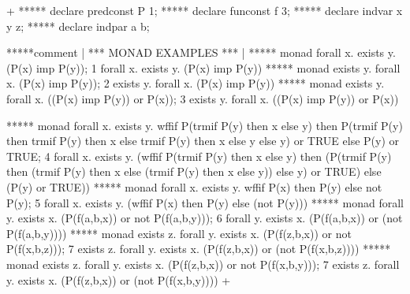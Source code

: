 



\gfexample+
   ***** declare predconst P 1;
   ***** declare funconst f 3;
   ***** declare indvar x y z;
   ***** declare indpar a b;
   
   *****comment | *** MONAD EXAMPLES *** |
   ***** monad forall x. exists y. (P(x) imp P(y));
   1   forall x. exists y. (P(x) imp P(y))
   ***** monad exists y. forall x. (P(x) imp P(y));
   2   exists y. forall x. (P(x) imp P(y))
   ***** monad exists y. forall x. ((P(x) imp P(y)) or P(x));
   3   exists y. forall x. ((P(x) imp P(y)) or P(x))
   
   ***** monad forall x. exists y.
    wffif P(trmif P(y) then x else y)
     then P(trmif P(y) 
             then trmif P(y) 
                   then x 
                   else trmif P(y) 
                         then x 
                         else y 
             else y) 
          or TRUE
     else P(y) or TRUE;
   4   forall x. exists y. 
       (wffif P(trmif P(y) then x else y) 
         then (P(trmif P(y) 
                 then 
                 (trmif P(y) 
                   then x 
                   else (trmif P(y) then x else y)) 
               else y) or TRUE) else (P(y) or TRUE))
   ***** monad forall x. exists y. wffif P(x) then P(y) else not P(y);
   5   forall x. exists y. (wffif P(x) then P(y) else (not P(y)))  
   ***** monad forall y. exists x. (P(f(a,b,x)) or not P(f(a,b,y)));
   6   forall y. exists x. (P(f(a,b,x)) or (not P(f(a,b,y))))
   ***** monad exists z. forall y. exists x. (P(f(z,b,x)) or not P(f(x,b,z)));
   7   exists z. forall y. exists x. (P(f(z,b,x)) or (not P(f(x,b,z)))) 
   ***** monad exists z. forall y. exists x. (P(f(z,b,x)) or not P(f(x,b,y)));
   7   exists z. forall y. exists x. (P(f(z,b,x)) or (not P(f(x,b,y)))) 
+
   
